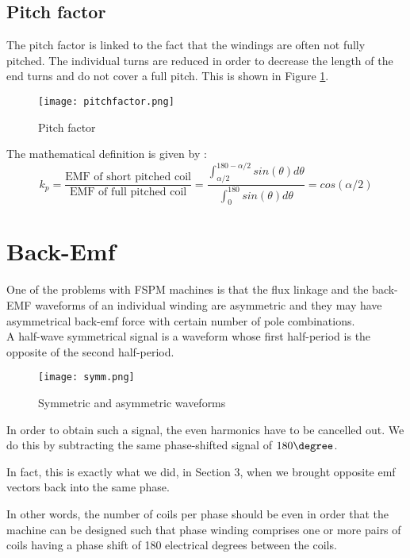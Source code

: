 \subsection{Pitch factor}
The pitch factor is linked to the fact that the windings are often not fully pitched. The individual turns are reduced in order to decrease the length of the end turns and do not cover a full pitch. This is shown in Figure \ref{fig:pitchfactor}.
\begin{figure}[H]
    \centering
    \texttt{[image: pitchfactor.png]}
    \caption{Pitch factor}
    \label{fig:pitchfactor}
\end{figure}
The mathematical definition is given by : 
\begin{equation}
    k_p = \frac{\text{EMF of short pitched coil}}{\text{EMF of full pitched coil}} = \frac{ \int_{\alpha/2}^{180-\alpha/2} sin (\theta) d\theta
    }{\int_{0}^{180} sin (\theta) d\theta
    } = cos(\alpha/2)
\end{equation}


\section{Back-Emf}
One of the problems with FSPM machines is that the flux linkage and the back-EMF waveforms of an individual winding are asymmetric and they may have asymmetrical back-emf force with certain number of pole combinations.\\
A half-wave symmetrical signal is a waveform whose first half-period is the opposite of the second half-period.
\begin{figure}[H]
    \centering
    \texttt{[image: symm.png]}
    \caption{Symmetric and asymmetric waveforms}
\end{figure}
In order to obtain such a signal, the even harmonics have to be cancelled out. We do this by subtracting the same phase-shifted signal of $180\degree$. 

In fact, this is exactly what we did, in Section 3, when we brought opposite emf vectors back into the same phase.

In other words, the number of coils per phase should be even in order that the machine can be designed such that phase winding comprises one or more pairs of coils having a phase shift of 180 electrical degrees between the coils.%

